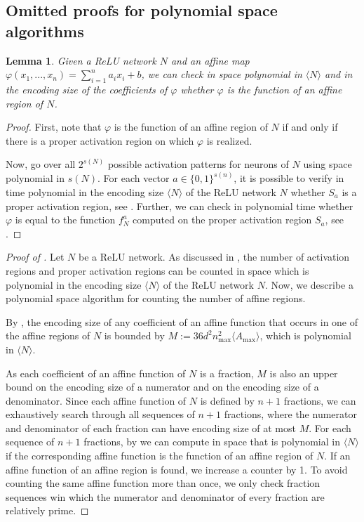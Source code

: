 \documentclass{article}
\newtheorem{lemma}[theorem]{Lemma}
\begin{document}
\subsection{Omitted proofs for polynomial space algorithms}
\begin{lemma}\label{lem:checkaffine}
Given a ReLU network $N$ and an affine map $\varphi(x_1,...,x_n)=\sum_{i=1}^n a_ix_i+b$,
we can check in space polynomial in $\langle N\rangle$ and in the encoding size of the coefficients of $\varphi$ whether $\varphi$ is the function of an affine region of $N$.
\end{lemma}
\begin{proof}
First, note that $\varphi$ is the function of an affine region of $N$ if and only if there is a proper activation region on which $\varphi$ is realized.

Now, go over all $2^{s(N)}$ possible activation patterns for neurons of $N$ using space polynomial in $s(N)$. For each vector $a\in\{0,1\}^{s(n)}$, it is possible to verify in time polynomial in the encoding size $\langle N \rangle$ of the ReLU network $N$ whether $S_a$ is a proper activation region, see .
Further, we can check in polynomial time whether $\varphi$ is equal to the function $f^a_N$ computed on the proper activation region $S_a$, see .
\end{proof}
\begin{proof}[Proof of ]
Let $N$ be a ReLU network.
As discussed in , the number of activation regions and proper activation regions can be counted in space which is polynomial in the encoding size $\langle N \rangle$ of the ReLU network $N$.
Now, we describe a polynomial space algorithm for counting the number of affine regions.

By , the encoding size of any coefficient of an affine function that occurs in one of the affine regions of $N$ is bounded by $M:=36d^2n_{\max}^2\langle A_{\max}\rangle$, which is polynomial in $\langle N \rangle$.

As each coefficient of an affine function of $N$ is a fraction, $M$ is also an upper bound on the encoding size of a numerator and on the encoding size of a denominator.
Since each affine function of $N$ is defined by $n+1$ fractions, we can exhaustively search through all sequences of $n+1$ fractions, where the numerator and denominator of each fraction can have encoding size of at most $M$. For each sequence of $n+1$ fractions, by  we can compute in space that is polynomial in $\langle N \rangle$ if the corresponding affine function is the function of an affine region of $N$.
If an affine function of an affine region is found, we increase a counter by 1.
To avoid counting the same affine function more than once, we only check fraction sequences win which the numerator and denominator of every fraction are relatively prime.
\end{proof}
\end{document}
